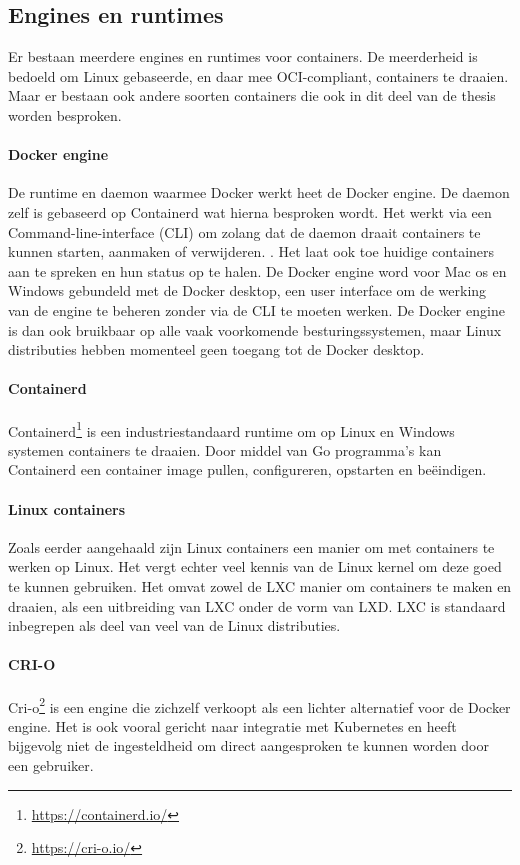 \subsection{Engines en runtimes}
Er bestaan meerdere engines en runtimes voor containers. De meerderheid is bedoeld om Linux gebaseerde, en daar mee OCI-compliant, containers te draaien. Maar er bestaan ook andere soorten containers die ook in dit deel van de thesis worden besproken.

\paragraph{Docker engine}
De runtime en daemon waarmee Docker werkt heet de Docker engine. De daemon zelf is gebaseerd op Containerd wat hierna besproken wordt. Het werkt via een Command-line-interface (CLI) om zolang dat de daemon draait containers te kunnen starten, aanmaken of verwijderen. . Het laat ook toe huidige containers aan te spreken en hun status op te halen. De Docker engine word voor Mac os en Windows gebundeld met de Docker desktop, een user interface om de werking van de engine te beheren zonder via de CLI te moeten werken. De Docker engine is dan ook bruikbaar op alle vaak voorkomende besturingssystemen, maar Linux distributies hebben momenteel geen toegang tot de Docker desktop.
\paragraph{Containerd}
Containerd\footnote{\url{https://containerd.io/}} is een industriestandaard runtime om op Linux en Windows systemen containers te draaien. Door middel van Go programma’s kan Containerd een container image pullen, configureren, opstarten en beëindigen.
\paragraph{Linux containers}
Zoals eerder aangehaald zijn Linux containers een manier om met containers te werken op Linux. Het vergt echter veel kennis van de Linux kernel om deze goed te kunnen gebruiken. Het omvat zowel de LXC manier om containers te maken en draaien, als een uitbreiding van LXC onder de vorm van LXD. LXC is standaard inbegrepen als deel van veel van de Linux distributies. 
\paragraph{CRI-O}
Cri-o\footnote{\url{https://cri-o.io/}} is een engine die zichzelf verkoopt als een lichter alternatief voor de Docker engine. Het is ook vooral gericht naar integratie met Kubernetes en heeft bijgevolg niet de ingesteldheid om direct aangesproken te kunnen worden door een gebruiker.
